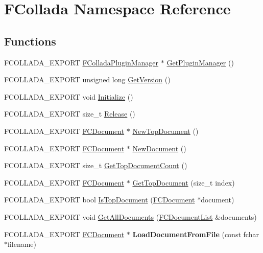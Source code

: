 \hypertarget{namespaceFCollada}{
\section{FCollada Namespace Reference}
\label{namespaceFCollada}
}
\subsection*{Functions}
\begin{DoxyCompactItemize}
\item 
FCOLLADA\_\-EXPORT \hyperlink{classFColladaPluginManager}{FColladaPluginManager} $\ast$ \hyperlink{namespaceFCollada_ae61741b7093942e65cb5149adadcadda}{GetPluginManager} ()
\item 
FCOLLADA\_\-EXPORT unsigned long \hyperlink{namespaceFCollada_a3cf1eb216d7981193dd45f69b7a93262}{GetVersion} ()
\item 
FCOLLADA\_\-EXPORT void \hyperlink{namespaceFCollada_a230b81bed3846303aab8c81637efa2e8}{Initialize} ()
\item 
FCOLLADA\_\-EXPORT size\_\-t \hyperlink{namespaceFCollada_ade9fdc7411f1e4534df399adb38c727b}{Release} ()
\item 
FCOLLADA\_\-EXPORT \hyperlink{classFCDocument}{FCDocument} $\ast$ \hyperlink{namespaceFCollada_a08fbadd88f588f40ed56d5edb9c7ecd0}{NewTopDocument} ()
\item 
FCOLLADA\_\-EXPORT \hyperlink{classFCDocument}{FCDocument} $\ast$ \hyperlink{namespaceFCollada_a0257b0ed467902dc5feda97e78c7cbe8}{NewDocument} ()
\item 
FCOLLADA\_\-EXPORT size\_\-t \hyperlink{namespaceFCollada_a5ef863c3011dd264403b519e32033947}{GetTopDocumentCount} ()
\item 
FCOLLADA\_\-EXPORT \hyperlink{classFCDocument}{FCDocument} $\ast$ \hyperlink{namespaceFCollada_ab9a8572da8317a620e6871912045a996}{GetTopDocument} (size\_\-t index)
\item 
FCOLLADA\_\-EXPORT bool \hyperlink{namespaceFCollada_ae2c3f1b2b333c2237abe5af27a85a8ce}{IsTopDocument} (\hyperlink{classFCDocument}{FCDocument} $\ast$document)
\item 
FCOLLADA\_\-EXPORT void \hyperlink{namespaceFCollada_ad1120d8ccf2ec3316f6c8d1c275a5d76}{GetAllDocuments} (\hyperlink{classfm_1_1pvector}{FCDocumentList} \&documents)
\item 
\hypertarget{namespaceFCollada_a6469ffded04fc77762eaa898ececb2a6}{
FCOLLADA\_\-EXPORT \hyperlink{classFCDocument}{FCDocument} $\ast$ {\bfseries LoadDocumentFromFile} (const fchar $\ast$filename)}
\label{namespaceFCollada_a6469ffded04fc77762eaa898ececb2a6}


\end{DoxyCompactItemize}
